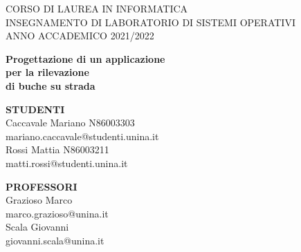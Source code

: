 \documentclass[a4paper,11pt]{report}
\begin{document}
	\begin{titlepage}

\begin{figure} [h]
\vspace{-2cm}
\hspace{-20mm}
\end{figure}
\vspace{2mm}

\begin{center}
\Large {CORSO DI LAUREA IN INFORMATICA\\
\centering INSEGNAMENTO DI LABORATORIO DI SISTEMI OPERATIVI \\
ANNO ACCADEMICO 2021/2022\\}
\end{center}
\vspace{10mm}

\begin{center}{
\Huge \textbf {Progettazione di un applicazione\\ per la rilevazione\\\vspace{2mm} di buche su strada}}
\end{center}
\vspace{4cm}

\begin{flushleft}
{\large \textbf {STUDENTI}  \\
\vspace{2mm}
Caccavale Mariano  N86003303 \\ 
mariano.caccavale@studenti.unina.it\\
\vspace{3mm}
Rossi Mattia N86003211 \\
matti.rossi@studenti.unina.it\\}
\end{flushleft}

\vspace{-42mm}
\hspace{4cm}
\begin{flushright}
{\large \textbf {PROFESSORI} \\
\vspace{2mm}
Grazioso Marco \\ marco.grazioso@unina.it\\
\vspace{3mm}
Scala Giovanni \\  giovanni.scala@unina.it\\}
\end{flushright}

	\end{titlepage}
	\clearpage
\end{document}

